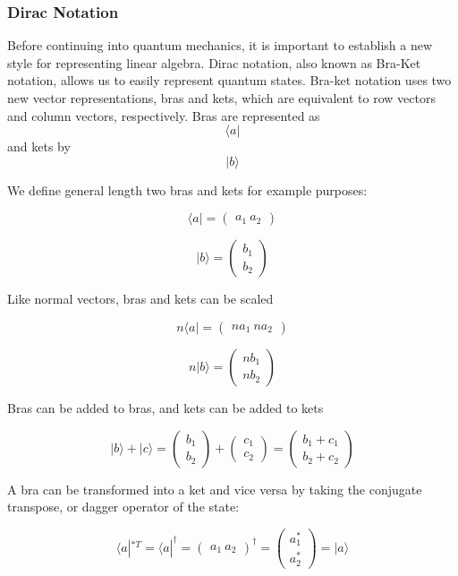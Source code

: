 \documentclass[11pt]{article}
\begin{document}
    \subsubsection{Dirac Notation}\label{dirac-notation}

    Before continuing into quantum mechanics, it is important to establish a
new style for representing linear algebra. Dirac notation, also known as
Bra-Ket notation, allows us to easily represent quantum states. Bra-ket
notation uses two new vector representations, bras and kets, which are
equivalent to row vectors and column vectors, respectively. Bras are
represented as \[\langle a |\] and kets by \[| b \rangle\]

We define general length two bras and kets for example purposes:

\[\langle a | = \begin{pmatrix} a_1 \ a_2 \end{pmatrix}\]

\[| b \rangle = \begin{pmatrix} b_1 \\ b_2 \end{pmatrix}\]

Like normal vectors, bras and kets can be scaled

\[n\langle a | = \begin{pmatrix} na_1 \ na_2 \end{pmatrix}\]

\[n| b \rangle = \begin{pmatrix} nb_1 \\ nb_2 \end{pmatrix}\]

Bras can be added to bras, and kets can be added to kets

\[ | b \rangle + | c \rangle =  \begin{pmatrix} b_1 \\ b_2 \end{pmatrix} + \begin{pmatrix} c_1 \\ c_2 \end{pmatrix} = \begin{pmatrix} b_1 + c_1 \\ b_2 + c_2 \end{pmatrix}\]

A bra can be transformed into a ket and vice versa by taking the
conjugate transpose, or dagger operator of the state:

\[\langle a |^{*T} = \langle a |^\dagger = \begin{pmatrix} a_1 \ a_2 \end{pmatrix}^\dagger = \begin{pmatrix} a_1^* \\ a_2^* \end{pmatrix} = | a \rangle\]
\end{document}
